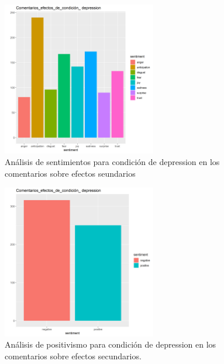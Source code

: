 \documentclass[spanish,]{article}
\begin{document}
\begin{figure}[h]
    \centering
    \includegraphics[width=0.6\textwidth]{figuras/sentimientos/Bdepression1.png}
    \caption{Análisis de sentimientos para condición de depression en los comentarios sobre efectos seundarios}
    \label{fig:sentimientos:19}
\end{figure}

\begin{figure}[h]
    \centering
    \includegraphics[width=0.6\textwidth]{figuras/sentimientos/Bdepression2.png}
    \caption{Análisis de positivismo para condición de depression en los comentarios sobre efectos secundarios.}
    \label{fig:sentimientos:20}
\end{figure}
\end{document}
